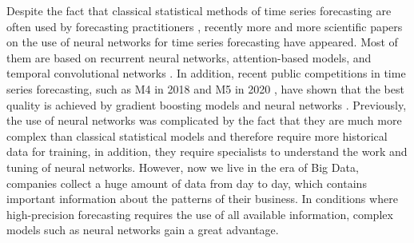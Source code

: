 \documentclass[12pt,a4paper]{article}
\begin{document}
Despite the fact that classical statistical methods of time series forecasting are often used by forecasting practitioners \cite{rnn2019}, recently more and more scientific papers on the use of neural networks for time series forecasting have appeared. Most of them are based on recurrent neural networks, attention-based models, and temporal convolutional networks \cite{tsdeeplearning2021}. In addition, recent public competitions in time series forecasting, such as M4 in 2018 \cite{MAKRIDAKIS202054} and M5 in 2020 \cite{m52020}, have shown that the best quality is achieved by gradient boosting models and neural networks \cite{m52020}. Previously, the use of neural networks was complicated by the fact that they are much more complex than classical statistical models and therefore require more historical data for training, in addition, they require specialists to understand the work and tuning of neural networks. However, now we live in the era of Big Data, companies collect a huge amount of data from day to day, which contains important information about the patterns of their business. In conditions where high-precision forecasting requires the use of all available information, complex models such as neural networks gain a great advantage.
\end{document}

